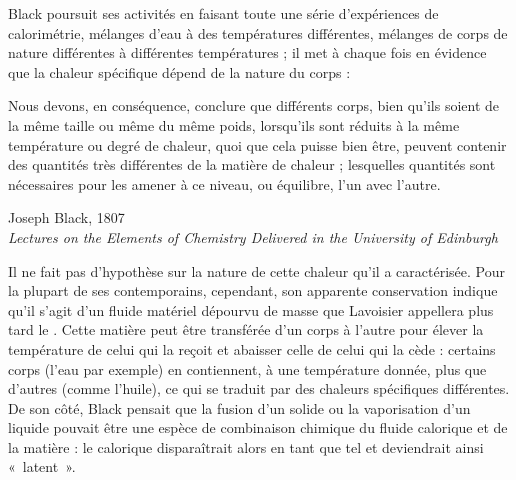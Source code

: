 	Black poursuit ses activités en faisant toute une série d'expériences de calorimétrie, mélanges d'eau à des températures différentes, mélanges de corps de nature différentes à différentes températures ; il met à chaque fois en évidence que la chaleur spécifique dépend de la nature du corps :
	
	\onlyframabook{\begin{quote}}
	\onlyamphibook{\begin{historyquote}}
		Nous devons, en conséquence, conclure que différents corps, bien qu’ils soient de la même taille ou même du même poids, lorsqu’ils sont réduits à la même température ou degré de chaleur, quoi que cela puisse bien être, peuvent contenir des quantités très différentes de la matière de chaleur ; lesquelles quantités sont nécessaires pour les amener à ce niveau, ou équilibre, l’un avec l’autre.
	\begin{flushright}\vspace{-0.5em}Joseph Black, 1807\\ \textit{Lectures on the Elements of Chemistry Delivered in the University of Edinburgh}~\cite{black1807}\end{flushright}
	\onlyamphibook{\end{historyquote}}
	\onlyframabook{\end{quote}}
	

	Il ne fait pas d'hypothèse sur la nature de cette chaleur qu'il a caractérisée. Pour la plupart de ses contemporains, cependant, son apparente conservation indique qu'il s'agit d'un fluide matériel dépourvu de masse que Lavoisier appellera plus tard le . Cette matière peut être transférée d'un corps à l'autre pour élever la température de celui qui la reçoit et abaisser celle de celui qui la cède : certains corps (l'eau par exemple) en contiennent, à une température donnée, plus que d'autres (comme l'huile), ce qui se traduit par des chaleurs spécifiques différentes. De son côté, Black pensait que la fusion d'un solide ou la vaporisation d'un liquide pouvait être une espèce de combinaison chimique du fluide calorique et de la matière : le calorique disparaîtrait alors en tant que tel et deviendrait ainsi «~latent~».

